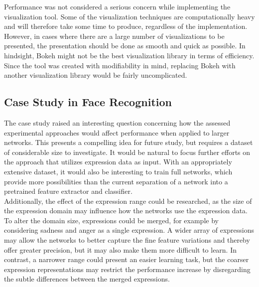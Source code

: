 \noindent Performance was not considered a serious concern while implementing the visualization tool. Some of the visualization techniques are computationally heavy and will therefore take some time to produce, regardless of the implementation. However, in cases where there are a large number of visualizations to be presented, the presentation should be done as smooth and quick as possible. In hindsight, Bokeh might not be the best visualization library in terms of efficiency. Since the tool was created with modifiability in mind, replacing Bokeh with another visualization library would be fairly uncomplicated. 

\begin{comment}
- Performance and efficiency
- Prediction
- Generalize even more
- More metrics
- Show architecture
- Several input images
- More comparison
- Better presentation of visualizations
\end{comment}

\subsection{Case Study in Face Recognition}

The case study raised an interesting question concerning how the assessed experimental approaches would affect performance when applied to larger networks. This presents a compelling idea for future study, but requires a dataset of considerable size to investigate. It would be natural to focus further efforts on the approach that utilizes expression data as input. With an appropriately extensive dataset, it would also be interesting to train full networks, which provide more possibilities than the current separation of a network into a pretrained feature extractor and classifier. \\

\noindent Additionally, the effect of the expression range could be researched, as the size of the expression domain may influence how the networks use the expression data. To alter the domain size, expressions could be merged, for example by considering sadness and anger as a single expression. A wider array of expressions may allow the networks to better capture the fine feature variations and thereby offer greater precision, but it may also make them more difficult to learn. In contrast, a narrower range could present an easier learning task, but the coarser expression representations may restrict the performance increase by disregarding the subtle differences between the merged expressions.


\cleardoublepage